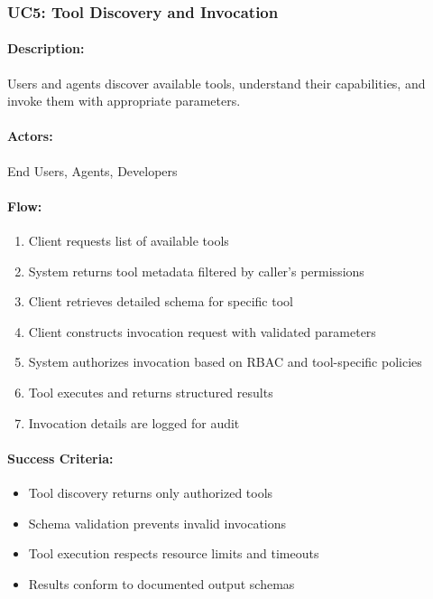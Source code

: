 \subsubsection{UC5: Tool Discovery and Invocation}

\paragraph{Description:} Users and agents discover available tools, understand their capabilities, and invoke them with appropriate parameters.

\paragraph{Actors:} End Users, Agents, Developers

\paragraph{Flow:}
\begin{enumerate}
    \item Client requests list of available tools
    \item System returns tool metadata filtered by caller's permissions
    \item Client retrieves detailed schema for specific tool
    \item Client constructs invocation request with validated parameters
    \item System authorizes invocation based on RBAC and tool-specific policies
    \item Tool executes and returns structured results
    \item Invocation details are logged for audit
\end{enumerate}

\paragraph{Success Criteria:}
\begin{itemize}
    \item Tool discovery returns only authorized tools
    \item Schema validation prevents invalid invocations
    \item Tool execution respects resource limits and timeouts
    \item Results conform to documented output schemas
\end{itemize}

